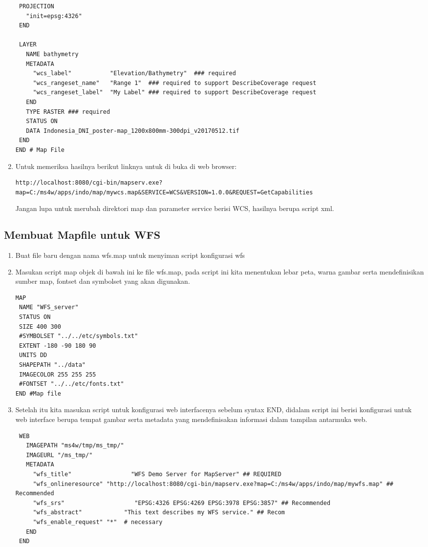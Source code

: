\begin{enumerate}
\begin{lstlisting}
 PROJECTION
   "init=epsg:4326"
 END

 LAYER
   NAME bathymetry
   METADATA
     "wcs_label"           "Elevation/Bathymetry"  ### required
     "wcs_rangeset_name"   "Range 1"  ### required to support DescribeCoverage request
     "wcs_rangeset_label"  "My Label" ### required to support DescribeCoverage request
   END
   TYPE RASTER ### required
   STATUS ON
   DATA Indonesia_DNI_poster-map_1200x800mm-300dpi_v20170512.tif
 END
END # Map File
\end{lstlisting}

\item Untuk memeriksa hasilnya berikut linknya untuk di buka di web browser:
\begin{lstlisting}
http://localhost:8080/cgi-bin/mapserv.exe?map=C:/ms4w/apps/indo/map/mywcs.map&SERVICE=WCS&VERSION=1.0.0&REQUEST=GetCapabilities
\end{lstlisting}

Jangan lupa untuk merubah direktori map dan parameter service berisi WCS, hasilnya berupa script xml.
\end{enumerate}

\subsection{Membuat Mapfile untuk WFS}
\begin{enumerate}
\item Buat file baru dengan nama wfs.map untuk menyiman script konfigurasi wfs
\item Masukan script map objek di bawah ini ke file wfs.map, pada script ini kita menentukan lebar peta, warna gambar serta mendefinisikan sumber map, fontset dan symbolset yang akan digunakan. 

\begin{lstlisting}
MAP
 NAME "WFS_server"
 STATUS ON
 SIZE 400 300
 #SYMBOLSET "../../etc/symbols.txt"
 EXTENT -180 -90 180 90
 UNITS DD
 SHAPEPATH "../data"
 IMAGECOLOR 255 255 255
 #FONTSET "../../etc/fonts.txt"
END #Map file
\end{lstlisting}
\item Setelah itu kita masukan script untuk konfigurasi web interfacenya sebelum syntax END, didalam script ini berisi konfigurasi untuk web interface berupa tempat gambar serta metadata yang mendefinisakan informasi dalam tampilan antarmuka web.

\begin{lstlisting}
 WEB
   IMAGEPATH "ms4w/tmp/ms_tmp/"
   IMAGEURL "/ms_tmp/"
   METADATA
     "wfs_title"                 "WFS Demo Server for MapServer" ## REQUIRED
     "wfs_onlineresource" "http://localhost:8080/cgi-bin/mapserv.exe?map=C:/ms4w/apps/indo/map/mywfs.map" ## Recommended      
     "wfs_srs"                    "EPSG:4326 EPSG:4269 EPSG:3978 EPSG:3857" ## Recommended
     "wfs_abstract"            "This text describes my WFS service." ## Recom
     "wfs_enable_request" "*"  # necessary
   END
 END
\end{lstlisting}
\end{enumerate}